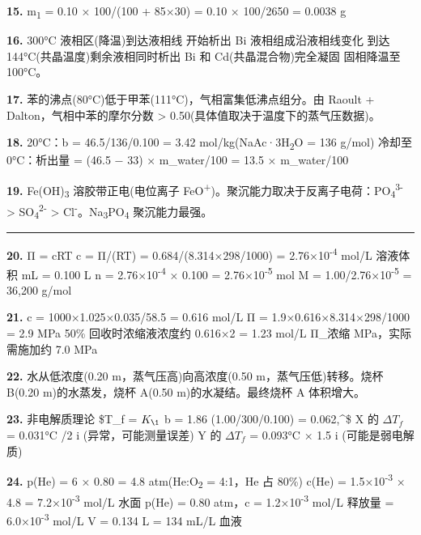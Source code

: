 \textbf{15.} m\textsubscript{1} = 0.10 × 100/(100 + 85×30) = 0.10 × 100/2650 = 0.0038 g

\textbf{16.} 300°C \箭 液相区(降温)\箭 到达液相线 \箭 开始析出 Bi \箭 液相组成沿液相线变化 \箭 到达 144°C(共晶温度)\箭 剩余液相同时析出 Bi 和 Cd(共晶混合物)\箭 完全凝固 \箭 固相降温至 100°C。

\textbf{17.} 苯的沸点(80°C)低于甲苯(111°C)，气相富集低沸点组分。由 Raoult + Dalton，气相中苯的摩尔分数 \textgreater{} 0.50(具体值取决于温度下的蒸气压数据)。

\textbf{18.} 20°C：b = 46.5/136/0.100 = 3.42 mol/kg(NaAc·3H\textsubscript{2}O = 136 g/mol)
冷却至 0°C：析出量 = (46.5 − 33) × m\_water/100 = 13.5 × m\_water/100

\textbf{19.} Fe(OH)\textsubscript{3} 溶胶带正电(电位离子 FeO\textsuperscript{+})。聚沉能力取决于反离子电荷：PO\textsubscript{4}\textsuperscript{3-} \textgreater{} SO\textsubscript{4}\textsuperscript{2-} \textgreater{} Cl\textsuperscript{-}。Na\textsubscript{3}PO\textsubscript{4} 聚沉能力最强。

\begin{center}\rule{0.5\linewidth}{0.5pt}\end{center}

\textbf{20.} Π = cRT \箭 c = Π/(RT) = 0.684/(8.314×298/1000) = 2.76×10\textsuperscript{-4} mol/L
溶液体积  mL = 0.100 L
n = 2.76×10\textsuperscript{-4} × 0.100 = 2.76×10\textsuperscript{-5} mol
M = 1.00/2.76×10\textsuperscript{-5} = 36,200 g/mol

\textbf{21.} c = 1000×1.025×0.035/58.5 = 0.616 mol/L
Π = 1.9×0.616×8.314×298/1000 = 2.9 MPa
50\% 回收时浓缩液浓度约 0.616×2 = 1.23 mol/L
Π\_浓缩  MPa，实际需施加约 7.0 MPa

\textbf{22.} 水从低浓度(0.20 m，蒸气压高)向高浓度(0.50 m，蒸气压低)转移。烧杯 B(0.20 m)的水蒸发，烧杯 A(0.50 m)的水凝结。最终烧杯 A 体积增大。

\textbf{23.} 非电解质理论 \$\Delta T\_f = \(K_{\1}\) \times b = 1.86 \times (1.00/300/0.100) = 0.062,\^{}\circ{}\$
X 的 \(\Delta T_f\) = 0.031°C /2 \箭 i (异常，可能测量误差)
Y 的 \(\Delta T_f\) = 0.093°C  × 1.5 \箭 i (可能是弱电解质)

\textbf{24.} p(He) = 6 × 0.80 = 4.8 atm(He:O\textsubscript{2} = 4:1，He 占 80\%)
c(He) = 1.5×10\textsuperscript{-3} × 4.8 = 7.2×10\textsuperscript{-3} mol/L
水面 p(He) = 0.80 atm，c = 1.2×10\textsuperscript{-3} mol/L
释放量 = 6.0×10\textsuperscript{-3} mol/L \箭 V = 0.134 L = 134 mL/L 血液

